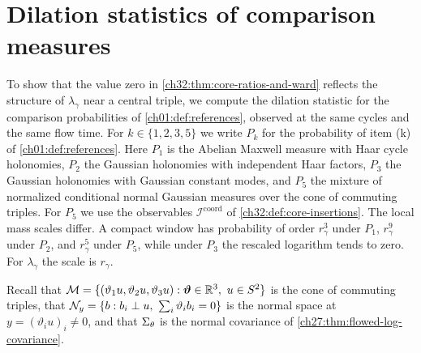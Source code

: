 \section{Dilation statistics of comparison measures}\label{ch32:sec:comparison}

To show that the value zero in \cref{ch32:thm:core-ratios-and-ward} reflects the structure of $\lambda_\gamma$ near a central triple, we compute the dilation statistic for the comparison probabilities of \cref{ch01:def:references}, observed at the same cycles and the same flow time. For $k\in\{1,2,3,5\}$ we write $P_k$ for the probability of item (k) of \cref{ch01:def:references}. Here $P_1$ is the Abelian Maxwell measure with Haar cycle holonomies, $P_2$ the Gaussian holonomies with independent Haar factors, $P_3$ the Gaussian holonomies with Gaussian constant modes, and $P_5$ the mixture of normalized conditional normal Gaussian measures over the cone of commuting triples. For $P_5$ we use the observables $\mathcal I^{\mathrm{coord}}$ of \cref{ch32:def:core-insertions}. The local mass scales differ. A compact window has probability of order $r_\gamma^3$ under $P_1$, $r_\gamma^9$ under $P_2$, and $r_\gamma^5$ under $P_5$, while under $P_3$ the rescaled logarithm tends to zero. For $\lambda_\gamma$ the scale is $r_\gamma$.

Recall that $\CommMan=\{(\vartheta_1u,\vartheta_2u,\vartheta_3u):\Toron\in\R^3,\ u\in S^2\}$ is the cone of commuting triples, that $\NormalFiber y=\{b:b_i\perp u,\ \sum_i\vartheta_ib_i=0\}$ is the normal space at $y=(\vartheta_iu)_i\ne0$, and that $\Sigma_\theta$ is the normal covariance of \cref{ch27:thm:flowed-log-covariance}.

